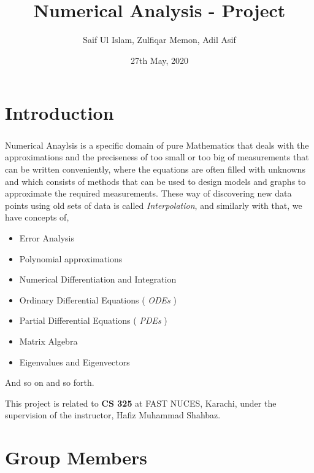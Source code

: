 \documentclass{article}
\author{Saif Ul Islam, Zulfiqar Memon, Adil Asif}
\title{Numerical Analysis - Project}
\date{27th May, 2020}
\begin{document}
    \maketitle

    \section*{Introduction}

        \begin{small}

            \subparagraph*{}
                Numerical Anaylsis is a specific domain of pure Mathematics that deals
                with the approximations and the preciseness of too small or too big of
                measurements that can be written conveniently, where the equations are
                often filled with unknowns and which consists of methods that can be
                used to design models and graphs to approximate the required measurements.
                These way of discovering new data points using old sets of data is called
                \emph{Interpolation}, and similarly with that, we have concepts of,

                \begin{itemize}
                    \item Error Analysis
                    \item Polynomial approximations
                    \item Numerical Differentiation and Integration
                    \item Ordinary Differential Equations ( \emph{ODEs} )
                    \item Partial Differential Equations ( \emph{PDEs} )
                    \item Matrix Algebra
                    \item Eigenvalues and Eigenvectors
                \end{itemize}

                And so on and so forth.

                This project is related to \textbf{CS 325} at FAST NUCES, Karachi,
                under the supervision of the instructor, Hafiz Muhammad Shahbaz.

        \end{small}

    \section*{Group Members}
\end{document}
